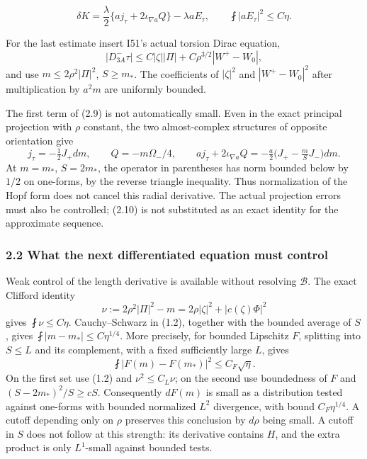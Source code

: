 \documentclass[
  11pt,
]{article}
\begin{document}
\[
 \delta K=\frac{\lambda}{2}
       \{a j_\tau+2\iota_{\nabla a}Q\}-\lambda aE_\tau,
 \qquad \fint |aE_\tau|^2\le C\eta.
 \tag{2.9}
\]

For the last estimate insert I51's actual torsion Dirac equation, \[
 |D^-_{3A}\tau|\le C|\zeta||\Pi|
                    +C\rho^{3/2}|W^+-W_0|,
\] and use \(m\le2\rho^2|\Pi|^2\), \(S\ge m_*\). The coefficients of
\(|\zeta|^2\) and \(|W^+-W_0|^2\) after multiplication by \(a^2m\) are
uniformly bounded.

The first term of (2.9) is not automatically small. Even in the exact
principal projection with \(\rho\) constant, the two almost-complex
structures of opposite orientation give \[
 j_\tau=-\tfrac12J_+dm,\qquad Q=-m\Omega_-/4,\qquad
 a j_\tau+2\iota_{\nabla a}Q
     =-\tfrac a2\bigl(J_+-\tfrac mS J_-\bigr)dm.
 \tag{2.10}
\] At \(m=m_*\), \(S=2m_*\), the operator in parentheses has norm
bounded below by \(1/2\) on one-forms, by the reverse triangle
inequality. Thus normalization of the Hopf form does not cancel this
radial derivative. The actual projection errors must also be controlled;
(2.10) is not substituted as an exact identity for the approximate
sequence.

\hypertarget{what-the-next-differentiated-equation-must-control}{%
\subsubsection{2.2 What the next differentiated equation must
control}\label{what-the-next-differentiated-equation-must-control}}

Weak control of the length derivative is available without resolving
\(\mathcal B\). The exact Clifford identity \[
 \nu:=2\rho^2|\Pi|^2-m
       =2\rho|\zeta|^2+|c(\zeta)\Phi|^2
\] gives \(\fint\nu\le C\eta\). Cauchy--Schwarz in (1.2), together with
the bounded average of \(S\), gives \(\fint|m-m_*|\le C\eta^{1/4}\).
More precisely, for bounded Lipschitz \(F\), splitting into \(S\le L\)
and its complement, with a fixed sufficiently large \(L\), gives \[
 \fint |F(m)-F(m_*)|^2\le C_F\sqrt\eta. \tag{2.11}
\] On the first set use (1.2) and \(\nu^2\le C_L\nu\); on the second use
boundedness of \(F\) and \((S-2m_*)^2/S\ge cS\). Consequently \(dF(m)\)
is small as a distribution tested against one-forms with bounded
normalized \(L^2\) divergence, with bound \(C_F\eta^{1/4}\). A cutoff
depending only on \(\rho\) preserves this conclusion by \(d\rho\) being
small. A cutoff in \(S\) does not follow at this strength: its
derivative contains \(H\), and the extra product is only \(L^1\)-small
against bounded tests.
\end{document}
